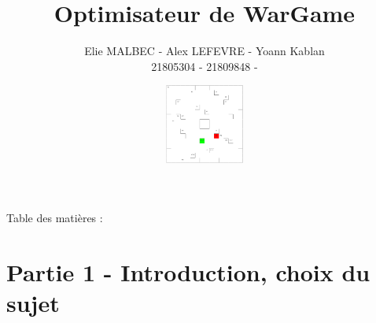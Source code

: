\documentclass{beamer} %
\title{Optimisateur de WarGame}
\author{Elie MALBEC - Alex LEFEVRE - Yoann Kablan \\
\small{{ 21805304 - 21809848 - }}}
\date{\includegraphics[height=2.6cm, width=10cm]{images/visuBoard.png}}
\institute{Université de Caen Normandie}
\begin{document}
\begin{frame}[plain]
	\titlepage 
\end{frame}

\begin{frame}[plain]
\Large{Table des matières :}
	\tableofcontents[hideallsubsections]
\end{frame}

%
%




\section{Partie 1 - Introduction, choix du sujet}
\end{document}
